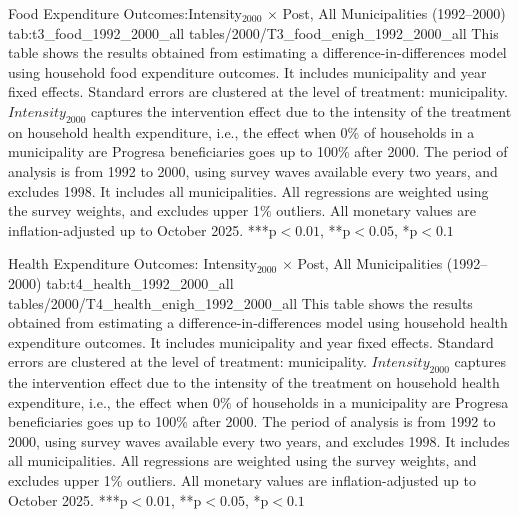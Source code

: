\mectable%
  {Food Expenditure Outcomes:Intensity$_{2000}$ $\times$ Post, All Municipalities (1992--2000)}%
  {tab:t3_food_1992_2000_all}%
  {tables/2000/T3_food_enigh_1992_2000_all}%
  {This table shows the results obtained from estimating a difference-in-differences model using household food expenditure outcomes. It includes municipality and year fixed effects. Standard errors are clustered at the level of treatment: municipality. $Intensity_{2000}$ captures the intervention effect due to the intensity of the treatment on household health expenditure, i.e., the effect when 0\% of households in a municipality are Progresa beneficiaries goes up to 100\% after 2000. The period of analysis is from 1992 to 2000, using survey waves available every two years, and excludes 1998. It includes all municipalities. All regressions are weighted using the survey weights, and excludes upper 1\% outliers. All monetary values are inflation-adjusted up to October 2025. ***p$<0.01$, **p$<0.05$, *p$<0.1$}%

\mectable%
  {Health Expenditure Outcomes: Intensity$_{2000}$ $\times$ Post, All Municipalities (1992--2000)}%
  {tab:t4_health_1992_2000_all}%
  {tables/2000/T4_health_enigh_1992_2000_all}%
  {This table shows the results obtained from estimating a difference-in-differences model using household health expenditure outcomes. It includes municipality and year fixed effects. Standard errors are clustered at the level of treatment: municipality. $Intensity_{2000}$ captures the intervention effect due to the intensity of the treatment on household health expenditure, i.e., the effect when 0\% of households in a municipality are Progresa beneficiaries goes up to 100\% after 2000. The period of analysis is from 1992 to 2000, using survey waves available every two years, and excludes 1998. It includes all municipalities. All regressions are weighted using the survey weights, and excludes upper 1\% outliers. All monetary values are inflation-adjusted up to October 2025. ***p$<0.01$, **p$<0.05$, *p$<0.1$}%
